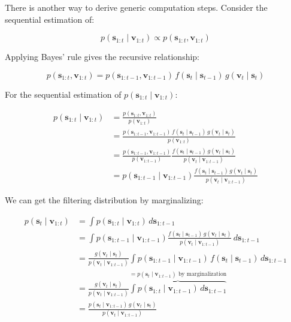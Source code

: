 \documentclass[11pt,a4paper]{article}
\begin{document}
There is another way to derive generic computation steps. Consider the sequential estimation of:

\begin{equation}
\label{eq:joint_posterior}
p(\mathbf{s}_{1:t} \mid \mathbf{v}_{1:t}) \propto p(\mathbf{s}_{1:t}, \mathbf{v}_{1:t})
\end{equation}

Applying Bayes' rule gives the recursive relationship:

\begin{equation}
\label{eq:recursive_joint}
p(\mathbf{s}_{1:t}, \mathbf{v}_{1:t}) = p(\mathbf{s}_{1:t-1}, \mathbf{v}_{1:t-1}) \, f(\mathbf{s}_t \mid \mathbf{s}_{t-1}) \, g(\mathbf{v}_t \mid \mathbf{s}_t)
\end{equation}

For the sequential estimation of $p(\mathbf{s}_{1:t} \mid \mathbf{v}_{1:t})$:

\begin{align}
p(\mathbf{s}_{1:t} \mid \mathbf{v}_{1:t}) &= \frac{p(\mathbf{s}_{1:t}, \mathbf{v}_{1:t})}{p(\mathbf{v}_{1:t})} \nonumber \\
&= \frac{p(\mathbf{s}_{1:t-1}, \mathbf{v}_{1:t-1}) \, f(\mathbf{s}_t \mid \mathbf{s}_{t-1}) \, g(\mathbf{v}_t \mid \mathbf{s}_t)}{p(\mathbf{v}_{1:t})} \nonumber \\
&= \frac{p(\mathbf{s}_{1:t-1}, \mathbf{v}_{1:t-1})}{p(\mathbf{v}_{1:t-1})} \frac{f(\mathbf{s}_t \mid \mathbf{s}_{t-1}) \, g(\mathbf{v}_t \mid \mathbf{s}_t)}{p(\mathbf{v}_t \mid \mathbf{v}_{1:t-1})} \nonumber \\
&= p(\mathbf{s}_{1:t-1} \mid \mathbf{v}_{1:t-1}) \frac{f(\mathbf{s}_t \mid \mathbf{s}_{t-1}) \, g(\mathbf{v}_t \mid \mathbf{s}_t)}{p(\mathbf{v}_t \mid \mathbf{v}_{1:t-1})}
\label{eq:recursive_tfd}
\end{align}

We can get the filtering distribution by marginalizing:

\begin{align}
p(\mathbf{s}_t \mid \mathbf{v}_{1:t}) &= \int p(\mathbf{s}_{1:t} \mid \mathbf{v}_{1:t}) \, d\mathbf{s}_{1:t-1} \nonumber \\
&= \int p(\mathbf{s}_{1:t-1} \mid \mathbf{v}_{1:t-1}) \frac{f(\mathbf{s}_t \mid \mathbf{s}_{t-1}) \, g(\mathbf{v}_t \mid \mathbf{s}_t)}{p(\mathbf{v}_t \mid \mathbf{v}_{1:t-1})} \, d\mathbf{s}_{1:t-1} \nonumber \\
&= \frac{g(\mathbf{v}_t \mid \mathbf{s}_t)}{p(\mathbf{v}_t \mid \mathbf{v}_{1:t-1})} \int p(\mathbf{s}_{1:t-1} \mid \mathbf{v}_{1:t-1}) \, f(\mathbf{s}_t \mid \mathbf{s}_{t-1}) \, d\mathbf{s}_{1:t-1} \nonumber \\
&= \frac{g(\mathbf{v}_t \mid \mathbf{s}_t)}{p(\mathbf{v}_t \mid \mathbf{v}_{1:t-1})} \overbrace{\int p(\mathbf{s}_{1:t} \mid \mathbf{v}_{1:t-1}) \, d\mathbf{s}_{1:t-1}}^{= p(\mathbf{s}_t \mid \mathbf{v}_{1:t-1}) \text{ by marginalization}} \nonumber \\
&= \frac{p(\mathbf{s}_t \mid \mathbf{v}_{1:t-1}) \, g(\mathbf{v}_t \mid \mathbf{s}_t)}{p(\mathbf{v}_t \mid \mathbf{v}_{1:t-1})}
\label{eq:sfd_deriv}
\end{align}
\end{document}
